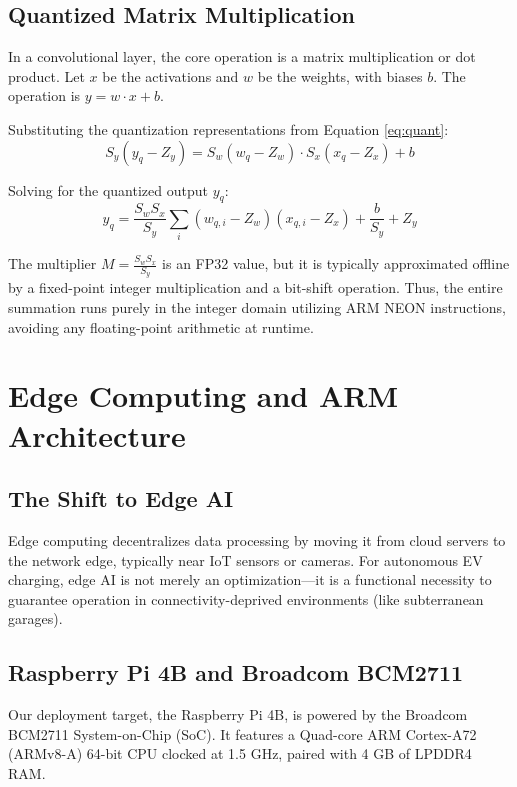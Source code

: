 \subsection{Quantized Matrix Multiplication}
In a convolutional layer, the core operation is a matrix multiplication or dot product. Let $x$ be the activations and $w$ be the weights, with biases $b$. The operation is $y = w \cdot x + b$.

Substituting the quantization representations from Equation \ref{eq:quant}:
\begin{equation}
    S_y (y_q - Z_y) = S_w (w_q - Z_w) \cdot S_x (x_q - Z_x) + b
\end{equation}

Solving for the quantized output $y_q$:
\begin{equation} \label{eq:quant_matmul}
    y_q = \frac{S_w S_x}{S_y} \sum_{i} (w_{q,i} - Z_w)(x_{q,i} - Z_x) + \frac{b}{S_y} + Z_y
\end{equation}

The multiplier $M = \frac{S_w S_x}{S_y}$ is an FP32 value, but it is typically approximated offline by a fixed-point integer multiplication and a bit-shift operation. Thus, the entire summation runs purely in the integer domain utilizing ARM NEON instructions, avoiding any floating-point arithmetic at runtime.

\section{Edge Computing and ARM Architecture}

\subsection{The Shift to Edge AI}
Edge computing decentralizes data processing by moving it from cloud servers to the network edge, typically near IoT sensors or cameras. For autonomous EV charging, edge AI is not merely an optimization---it is a functional necessity to guarantee operation in connectivity-deprived environments (like subterranean garages).

\subsection{Raspberry Pi 4B and Broadcom BCM2711}
Our deployment target, the Raspberry Pi 4B, is powered by the Broadcom BCM2711 System-on-Chip (SoC). It features a Quad-core ARM Cortex-A72 (ARMv8-A) 64-bit CPU clocked at 1.5 GHz, paired with 4 GB of LPDDR4 RAM.

